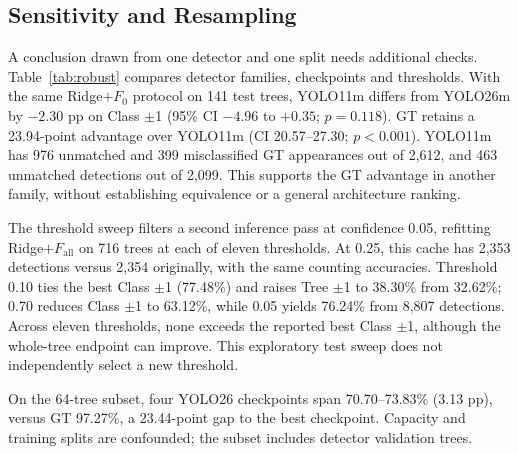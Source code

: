 \documentclass[conference,a4paper]{IEEEtran}
\begin{document}
\subsection{Sensitivity and Resampling}
\label{sec:robust}
A conclusion drawn from one detector and one split needs additional checks.
Table~\ref{tab:robust} compares detector families, checkpoints and thresholds. With the
same Ridge$+F_0$ protocol on 141 test trees, YOLO11m differs from YOLO26m by
$-2.30$ pp on Class $\pm$1 (95\% CI $-4.96$ to $+0.35$; $p=0.118$).
GT retains a 23.94-point advantage over YOLO11m (CI 20.57--27.30; $p<0.001$).
YOLO11m has 976 unmatched and 399 misclassified GT appearances out of 2,612,
and 463 unmatched detections out of 2,099. This supports the GT advantage in
another family, without establishing equivalence or a general architecture ranking.

The threshold sweep filters a second inference pass at confidence 0.05,
refitting Ridge$+F_{\text{all}}$ on 716 trees at each of eleven thresholds.
At 0.25, this cache has 2,353 detections versus 2,354 originally, with the same
counting accuracies. Threshold 0.10 ties the best Class $\pm$1 (77.48\%) and
raises Tree $\pm$1 to 38.30\% from 32.62\%; 0.70 reduces Class $\pm$1 to
63.12\%, while 0.05 yields 76.24\% from 8,807 detections. Across eleven thresholds, none exceeds the reported best Class $\pm$1,
although the whole-tree endpoint can improve. This exploratory test sweep
does not independently select a new threshold.

On the 64-tree subset, four YOLO26
checkpoints span 70.70--73.83\% (3.13 pp), versus GT 97.27\%, a 23.44-point
gap to the best checkpoint. Capacity and training splits are confounded;
the subset includes detector validation trees.
\end{document}
